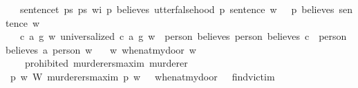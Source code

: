 \begin{isabellebody}
\ \ \ {\isachardoublequoteopen}{\isasymforall}sentence{\isacharcolon}{\isacharcolon}t{\isachardot}\ {\isasymforall}p{}{\isacharcolon}{\isacharcolon}s{\isachardot}\ {\isasymforall}p{}{\isacharcolon}{\isacharcolon}s{\isachardot}\ {\isasymforall}w{\isacharcolon}{\isacharcolon}i{\isachardot}\ {\isacharparenleft}{\isacharparenleft}p{}\ believes\ {\isacharparenleft}utter{\isacharunderscore}falsehood\ p{}\ sentence{\isacharparenright}{\isacharparenright}\ w{\isacharparenright}\ {\isasymlongrightarrow}\ {\isacharparenleft}{\isasymnot}\ {\isacharparenleft}p{}\ believes\ sentence{\isacharparenright}\ w{\isacharparenright}{\isachardoublequoteclose}\isanewline
%
\isanewline
\ \ \ {\isachardoublequoteopen}{\isasymforall}c\ a\ g\ w{\isachardot}\ {\isacharparenleft}universalized\ {\isacharparenleft}c{\isacharcomma}\ a{\isacharcomma}\ g{\isacharparenright}\ w{\isacharparenright}\ {\isasymlongrightarrow}\ {\isacharparenleft}{\isacharparenleft}person{}\ believes\ {\isacharparenleft}person{}\ believes\ c{\isacharparenright}{\isacharparenright}\ \isactrlbold {\isasymrightarrow}\ {\isacharparenleft}person{}\ believes\ {\isacharparenleft}a\ person{}{\isacharparenright}{\isacharparenright}{\isacharparenright}\ w{\isachardoublequoteclose}\isanewline
%
\isanewline
\ \ \ {\isachardoublequoteopen}{\isasymforall}w{\isachardot}\ when{\isacharunderscore}at{\isacharunderscore}my{\isacharunderscore}door\ w{\isachardoublequoteclose}\isanewline
%
\isanewline
\ \ \ {\isachardoublequoteopen}{\isasymTurnstile}\ {\isacharparenleft}prohibited\ murderers{\isacharunderscore}maxim\ murderer{\isacharparenright}{\isachardoublequoteclose}\isanewline
%
\isadelimproof
%
\endisadelimproof
%
\isatagproof
{}\isamarkupfalse%
\ {\isacharminus}\ \isanewline
\ \ \isamarkupfalse%
\ {\isachardoublequoteopen}{\isacharparenleft}{\isasymforall}p\ w{\isachardot}\ {\isacharparenleft}W\ murderers{\isacharunderscore}maxim\ p{\isacharparenright}\ w{\isacharparenright}\ {\isasymlongrightarrow}\ {\isacharparenleft}{\isasymTurnstile}\ {\isacharparenleft}when{\isacharunderscore}at{\isacharunderscore}my{\isacharunderscore}door\ \isactrlbold {\isasymrightarrow}\ {\isacharparenleft}\isactrlbold {\isasymnot}\ find{\isacharunderscore}victim{\isacharparenright}{\isacharparenright}{\isacharparenright}{\isachardoublequoteclose}\isanewline

\end{isabellebody}
